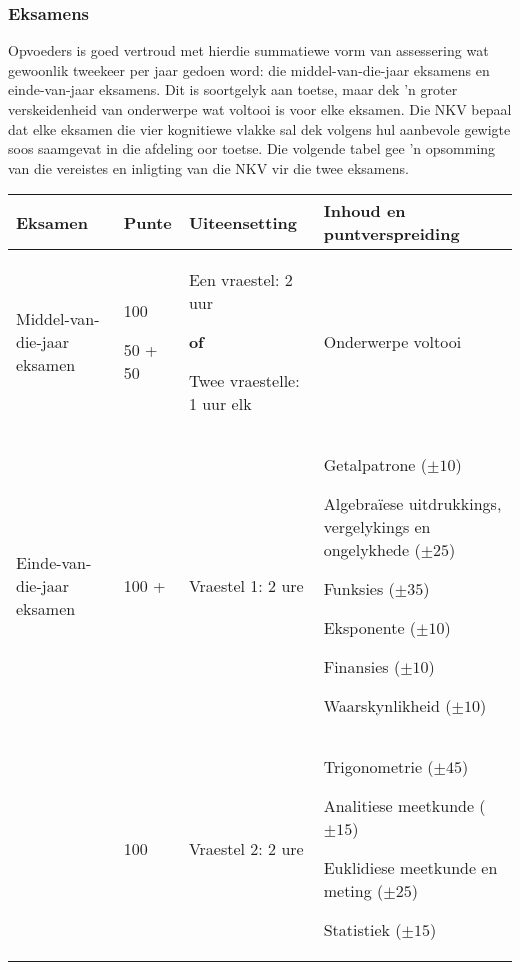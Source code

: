\subsubsection{Eksamens}
Opvoeders is goed vertroud met hierdie summatiewe vorm van assessering wat gewoonlik tweekeer per jaar gedoen word: die middel-van-die-jaar eksamens en einde-van-jaar eksamens. Dit is soortgelyk aan toetse, maar dek 'n groter verskeidenheid van onderwerpe wat voltooi is voor elke eksamen. Die NKV bepaal dat elke eksamen die vier kognitiewe vlakke sal dek volgens hul aanbevole gewigte soos saamgevat in die afdeling oor toetse. Die volgende tabel gee 'n opsomming van die vereistes en inligting van die NKV vir die twee eksamens.

\begin{table}[H]
\begin{center}
\begin{tabular} {|p{2cm}|p{1.5cm}|p{3cm}|p{4.5cm}|} \hline
\textbf{Eksamen} &
\textbf{Punte} &
\textbf{Uiteensetting} &
\textbf{Inhoud en puntverspreiding} \\ \hline
Middel-van-die-jaar eksamen &
100 \par 50 + 50 &
Een vraestel: 2 uur\par \textbf{of} \par
Twee vraestelle: 1 uur elk &
Onderwerpe voltooi \\ \hline
Einde-van-die-jaar eksamen	&
100 + &
Vraestel 1: 2 ure &
Getalpatrone ($\pm 10$) \par 
Algebra\"{i}ese uitdrukkings, vergelykings en ongelykhede ($\pm 25$)\par 
Funksies ($\pm 35$)\par 
Eksponente ($\pm 10$)\par 
Finansies ($\pm 10$)\par 
Waarskynlikheid ($\pm 10$)
\\ \hline
&
100 &
Vraestel 2: 2 ure &
Trigonometrie ($\pm 45$) \par 
Analitiese meetkunde ($\pm 15$)\par 
Euklidiese meetkunde en meting ($\pm 25$)\par 
Statistiek ($\pm 15$)
\\ \hline
\end{tabular}
 \end{center}
\end{table}


